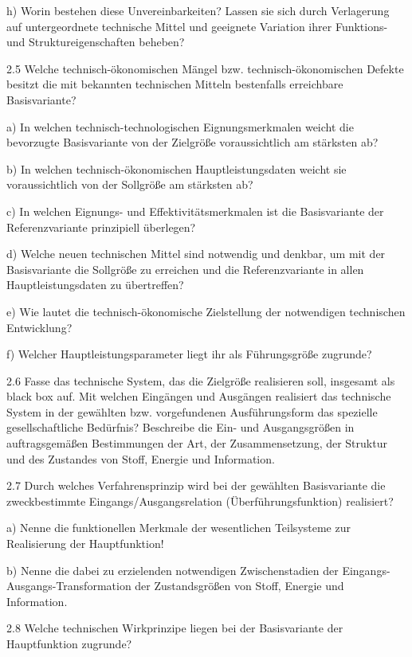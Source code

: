 \documentclass[12pt,a4paper]{article}
\begin{document}
h) Worin bestehen diese Unvereinbarkeiten? Lassen sie sich durch Verlagerung
auf untergeordnete technische Mittel und geeignete Variation ihrer Funktions-
und Struktureigenschaften beheben?

2.5 Welche technisch-ökonomischen Mängel bzw. technisch-ökonomischen Defekte
besitzt die mit bekannten technischen Mitteln bestenfalls erreichbare
Basisvariante?

a) In welchen technisch-technologischen Eignungsmerkmalen weicht die bevorzugte
Basisvariante von der Zielgröße voraussichtlich am stärksten ab?

b) In welchen technisch-ökonomischen Hauptleistungsdaten weicht sie
voraussichtlich von der Sollgröße am stärksten ab?

c) In welchen Eignungs- und Effektivitätsmerkmalen ist die Basisvariante der
Referenzvariante prinzipiell überlegen?

d) Welche neuen technischen Mittel sind notwendig und denkbar, um mit der
Basisvariante die Sollgröße zu erreichen und die Referenzvariante in allen
Hauptleistungsdaten zu übertreffen?

e) Wie lautet die technisch-ökonomische Zielstellung der notwendigen
technischen Entwicklung?

f) Welcher Hauptleistungsparameter liegt ihr als Führungsgröße zugrunde?

2.6 Fasse das technische System, das die Zielgröße realisieren soll, insgesamt
als black box auf. Mit welchen Eingängen und Ausgängen realisiert das
technische System in der gewählten bzw. vorgefundenen Ausführungsform das
spezielle gesellschaftliche Bedürfnis?  Beschreibe die Ein- und Ausgangsgrößen
in auftragsgemäßen Bestimmungen der Art, der Zusammensetzung, der Struktur und
des Zustandes von Stoff, Energie und Information.

2.7 Durch welches Verfahrensprinzip wird bei der gewählten Basisvariante die
zweckbestimmte Eingangs/Ausgangsrelation (Überführungsfunktion) realisiert?

a) Nenne die funktionellen Merkmale der wesentlichen Teilsysteme zur
Realisierung der Hauptfunktion!

b) Nenne die dabei zu erzielenden notwendigen Zwischenstadien der
Eingangs-Ausgangs-Transformation der Zustandsgrößen von Stoff, Energie und
Information.

2.8 Welche technischen Wirkprinzipe liegen bei der Basisvariante der
Hauptfunktion zugrunde?
\end{document}
